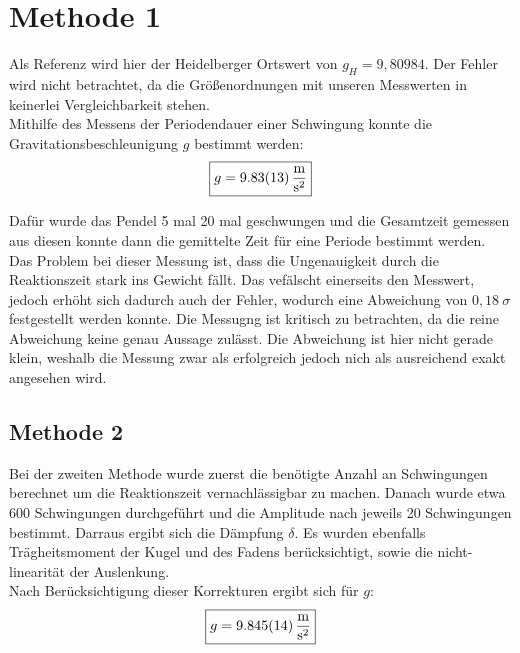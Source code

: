 \section{Methode 1}
Als Referenz wird hier der Heidelberger Ortswert von $g_H = 9,80984$. Der Fehler wird nicht betrachtet, da die Größenordnungen mit unseren Messwerten
in keinerlei Vergleichbarkeit stehen. \\
Mithilfe des Messens der Periodendauer einer Schwingung konnte die Gravitationsbeschleunigung $g$ bestimmt werden:
\[\boxed{g =\SI{9,83 \pm 0,13 }{\frac{\meter}{\second^2}}}\]

Dafür wurde das Pendel 5 mal 20 mal geschwungen und die Gesamtzeit gemessen aus diesen konnte dann die gemittelte Zeit
für eine Periode bestimmt werden.\\
Das Problem bei dieser Messung ist, dass die Ungenauigkeit durch die Reaktionszeit stark ins Gewicht fällt.
Das vefälscht einerseits den Messwert, jedoch erhöht sich dadurch auch der Fehler, wodurch eine Abweichung von $0,18\ \sigma$
festgestellt werden konnte. Die Messugng ist kritisch zu betrachten, da die reine Abweichung keine genau Aussage zulässt.
Die Abweichung ist hier nicht gerade klein, weshalb die Messung zwar als erfolgreich jedoch nich als ausreichend exakt angesehen wird.

\subsection{Methode 2}
Bei der zweiten Methode wurde zuerst die benötigte Anzahl an Schwingungen berechnet um die Reaktionszeit vernachlässigbar zu machen.
Danach wurde etwa 600 Schwingungen durchgeführt und die Amplitude nach jeweils 20 Schwingungen bestimmt. Darraus ergibt sich die
Dämpfung $\delta$. Es wurden ebenfalls Trägheitsmoment der Kugel und des Fadens berücksichtigt, sowie die nicht-linearität der Auslenkung.\\
Nach Berücksichtigung dieser Korrekturen ergibt sich für $g$:
\[\boxed{g = \SI{9,845 \pm 0,014}{\frac{\meter}{\second^2}}}\]

